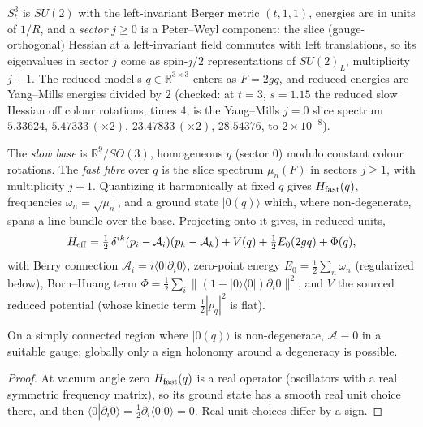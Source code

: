 \newpage
{}

$S^3_t$ is $SU(2)$ with the left-invariant Berger metric $(t,1,1)$, energies are in units of $1/R$, and a \emph{sector}
$j\geq0$ is a Peter--Weyl component: the slice (gauge-orthogonal) Hessian at a left-invariant field commutes with left
translations, so its eigenvalues in sector $j$ come as spin-$j/2$ representations of $SU(2)_L$, multiplicity $j+1$. The
reduced model's $q\in\mathbb{R}^{3\times3}$ enters as $F=2gq$, and reduced energies are Yang--Mills energies divided by $2$
(checked: at $t=3$, $s=1.15$ the reduced slow Hessian off colour rotations, times $4$, is the Yang--Mills $j=0$ slice spectrum $5.33624$, $5.47333\,(\times2)$, $23.47833\,(\times2)$, $28.54376$, to $2\times10^{-8}$).

\begin{definition}\label{p4def:bo}
The \emph{slow base} is $\mathbb{R}^{9}/SO(3)$, homogeneous $q$ (sector $0$) modulo constant colour rotations. The
\emph{fast fibre} over $q$ is the slice spectrum $\mu_n(F)$ in sectors $j\geq1$, with multiplicity $j+1$. Quantizing it
harmonically at fixed $q$ gives $H_{\rm fast}(q)$, frequencies $\omega_n=\sqrt{\mu_n}$, and a ground state $|0(q)\rangle$
which, where non-degenerate, spans a line bundle over the base. Projecting onto it gives, in reduced units,
\[
 H_{\rm eff}=\tfrac12\,\delta^{ik}(p_i-\mathcal{A}_i)(p_k-\mathcal{A}_k)+V(q)+\tfrac12E_0(2gq)+\Phi(q),
\]
with Berry connection $\mathcal{A}_i=i\langle0|\partial_i0\rangle$, zero-point energy $E_0=\tfrac12\sum_n\omega_n$
(regularized below), Born--Huang term $\Phi=\tfrac12\sum_i\|(1-|0\rangle\langle0|)\partial_i0\|^2$, and $V$ the sourced
reduced potential (whose kinetic term $\tfrac12|p_q|^2$ is flat).
\end{definition}

\begin{lemma}\label{p4lem:berry}
 On a simply connected region where $|0(q)\rangle$ is non-degenerate, $\mathcal{A}\equiv0$ in a suitable
gauge; globally only a sign holonomy around a degeneracy is possible.
\end{lemma}
\begin{proof}
At vacuum angle zero $H_{\rm fast}(q)$ is a real operator (oscillators with a real symmetric frequency matrix), so its ground state has a smooth real unit
choice there, and then $\langle0|\partial_i0\rangle=\tfrac12\partial_i\langle0|0\rangle=0$. Real unit choices differ by a sign.
\end{proof}

